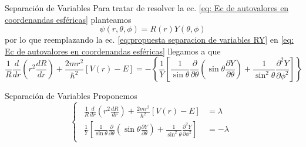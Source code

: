 \begin{frame}{Separación de Variables}
	Para tratar de resolver la ec. \ref{eq: Ec de autovalores en coordenandas esféricas} planteamos 
		\begin{equation}
    		\psi(r,\theta,\phi) = R(r) Y(\theta,\phi)
    		\label{eq:propuesta separacion de variables RY}
		\end{equation}
	por lo que reemplazando la ec. \ref{eq:propuesta separacion de variables RY} en \ref{eq: Ec de autovalores en coordenandas esféricas} llegamos a que 
	\[
		\frac{1}{R}\frac{d}{dr}\left( r^2 \frac{dR}{dr} \right) + \frac{2mr^2}{\hbar^2} \left[ V(r) - E\right] =-\left\{ \frac{1}{Y}\left[ \frac{1}{\sin{\theta}} \frac{\partial}{\partial\theta} \left(\sin{\theta}\frac{\partial Y}{\partial\theta}\right)+ \frac{1}{\sin^2\theta} \frac{\partial^2Y} {\partial\phi^2}\right] \right\} 
	\]
\end{frame}

\begin{frame}{Separación de Variables}
	Proponemos 
	\begin{equation}
			\begin{cases}
			\begin{aligned}
				\frac{1}{R}\frac{d}{dr}\left( r^2 \frac{dR}{dr} \right) + \frac{2mr^2}{\hbar^2} \left[ V(r) - E\right] &= \lambda \\
				\frac{1}{Y}\left[ \frac{1}{\sin{\theta}} \frac{\partial}{\partial\theta} \left(\sin{\theta}\frac{\partial Y}{\partial\theta}\right)+ \frac{1}{\sin^2\theta} \frac{\partial^2Y} {\partial\phi^2}\right] &=-\lambda
			\end{aligned}
		\end{cases}
		\label{eq:separacion de variables RY}
	\end{equation}
\end{frame}

